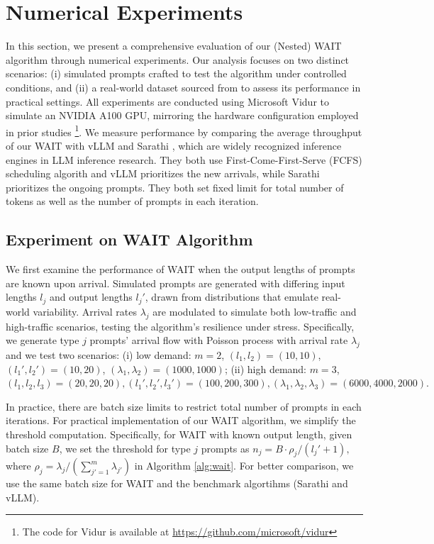 \section{Numerical Experiments}
\label{sec:experiments}

In this section, we present a comprehensive evaluation of our (Nested) WAIT algorithm through numerical experiments. Our analysis focuses on two distinct scenarios: (i) simulated prompts crafted to test the algorithm under controlled conditions, and (ii) a real-world dataset sourced from \cite{zheng2023lmsys} to assess its performance in practical settings. All experiments are conducted using Microsoft Vidur to simulate an NVIDIA A100 GPU, mirroring the hardware configuration employed in prior studies \citep{agrawal2024vidur}\footnote{The code for Vidur is available at \url{https://github.com/microsoft/vidur}}. We measure performance by comparing the average throughput of our WAIT with vLLM \citep{kwon2023efficient} and Sarathi \citep{agrawal2023sarathi}, which are widely recognized inference engines in LLM inference research. They both use First-Come-First-Serve (FCFS) scheduling algorith and vLLM prioritizes the new arrivals, while Sarathi prioritizes the ongoing prompts. They both set fixed limit for total number of tokens as well as the number of prompts in each iteration.


\subsection{Experiment on WAIT Algorithm}
We first examine the performance of WAIT when the output lengths of prompts are known upon arrival. Simulated prompts are generated with differing input lengths \( l_j \) and output lengths \( l_j' \), drawn from distributions that emulate real-world variability. Arrival rates \( \lambda_j \) are modulated to simulate both low-traffic and high-traffic scenarios, testing the algorithm's resilience under stress. Specifically, we generate type $j$ prompts' arrival flow with Poisson process with arrival rate $\lambda_j$ and we test two scenarios: (i) low demand: $m=2$, $(l_1,l_2)=(10,10)$, $(l_1',l_2')=(10,20)$, $(\lambda_1,\lambda_2)=(1000,1000)$; (ii) high demand: $m=3$, $(l_1,l_2,l_3)=(20,20,20),(l_1',l_2',l_3')=(100,200,300),(\lambda_1,\lambda_2,\lambda_3)=(6000,4000,2000).$

 In practice, there are batch size limits to restrict total number of prompts in each iterations. For practical implementation of our WAIT algorithm, we simplify the threshold computation. Specifically, for WAIT with known output length, given batch size $B$, we set the threshold for type $j$ prompts as $n_j=B\cdot\rho_j/(l_j'+1),$ where $\rho_j=\lambda_j/(\sum_{j'=1}^m\lambda_{j'})$ in Algorithm \ref{alg:wait}. For better comparison, we use the same batch size for WAIT and the benchmark algortihms (Sarathi and vLLM).

